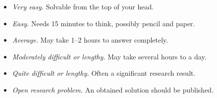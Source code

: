 \documentclass[fontsize=11pt, parskip=half]{scrartcl}
\begin{document}
\begin{itemize}\itemsep=2pt
    \item[\textbf{[00]}] \emph{Very easy.} Solvable from the top of your head.
    \item[\textbf{[10]}] \emph{Easy.} Needs 15 minutes to think, possibly pencil and paper.
    \item[\textbf{[20]}] \emph{Average.} May take 1--2 hours to answer completely.
    \item[\textbf{[30]}] \emph{Moderately difficult or lengthy.} May take several hours to a day.
    \item[\textbf{[40]}] \emph{Quite difficult or lengthy.} Often a significant research result.
    \item[\textbf{[50]}] \emph{Open research problem.} An obtained solution should be published.
\end{itemize}


\clearpage


\end{document}

